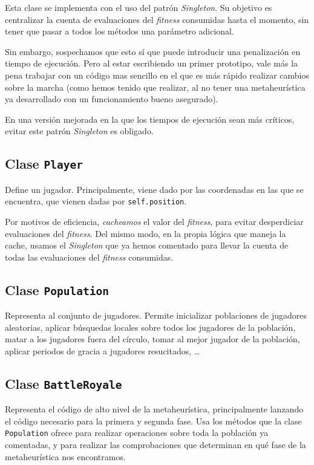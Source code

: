 \documentclass[11pt]{article}
\begin{document}
Esta clase se implementa con el uso del patrón \emph{Singleton}. Su objetivo es centralizar la cuenta de evaluaciones del \emph{fitness} consumidas hasta el momento, sin tener que pasar a todos los métodos una parámetro adicional.

Sin embargo, sospechamos que esto sí que puede introducir una penalización en tiempo de ejecución. Pero al estar escribiendo un primer prototipo, vale más la pena trabajar con un código mas sencillo en el que es más rápido realizar cambios sobre la marcha (como hemos tenido que realizar, al no tener una metaheurística ya desarrollado con un funcionamiento bueno asegurado).

En una versión mejorada en la que los tiempos de ejecución sean más críticos, evitar este patrón \emph{Singleton} es obligado.

\subsection{Clase \lstinline{Player}}

Define un jugador. Principalmente, viene dado por las coordenadas en las que se encuentra, que vienen dadas por \lstinline{self.position}.

Por motivos de eficiencia, \emph{cacheamos} el valor del \emph{fitness}, para evitar desperdiciar evaluaciones del \emph{fitness}. Del mismo modo, en la propia lógica que maneja la cache, usamos el \emph{Singleton} que ya hemos comentado para llevar la cuenta de todas las evaluaciones del \emph{fitness} consumidas.

\subsection{Clase \lstinline{Population}}

Representa al conjunto de jugadores. Permite inicializar poblaciones de jugadores aleatorias, aplicar búsquedas locales sobre todos los jugadores de la población, matar a los jugadores fuera del círculo, tomar al mejor jugador de la población, aplicar periodos de gracia a jugadores resucitados, \ldots

\subsection{Clase \lstinline{BattleRoyale}}

Representa el código de alto nivel de la metaheurística, principalmente lanzando el código necesario para la primera y segunda fase. Usa los métodos que la clase \lstinline{Population} ofrece para realizar operaciones sobre toda la población ya comentadas, y para realizar las comprobaciones que determinan en qué fase de la metaheurística nos encontramos.
\end{document}
